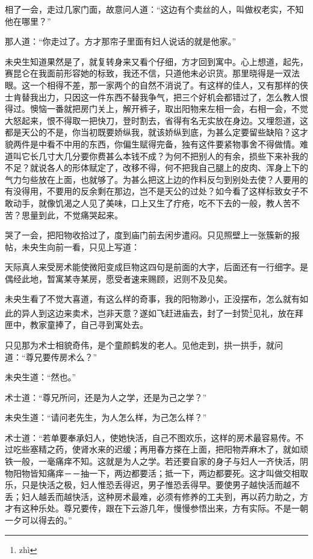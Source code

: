 \documentclass[a4paper,12pt,UTF8,twoside]{ctexbook}
\begin{document}
相了一会，走过几家门面，故意问人道：“这边有个卖丝的人，叫做权老实，不知他在哪里？”

那人道：“你走过了。方才那帘子里面有妇人说话的就是他家。”

未央生知道果然是了，就复转身来又看个仔细，方才回到寓中。心上想道，起先，赛昆仑在我面前形容她的标致，我还不信，只道他未必识货。那里晓得是一双法眼。这一个相得不差，那一家两个的自然不消说了。有这样的佳人，又有那样的侠士肯替我出力，只因这一件东西不替我争气，把三个好机会都错过了，怎么教人恨得过。懊恼一番就把房门关上，解开裤子，取出阳物来左相一会，右相一会，不觉大怒起来，恨不得取一把快刀，登时割去，省得有名无实放在身边。又埋怨道，这都是天公的不是，你当初既要娇纵我，就该娇纵到底，为甚么定要留些缺陷？这才貌两件是中看不中用的东西，你偏生赋得完备，独有这件要紧物事舍不得做情。难道叫它长几寸大几分要你费甚么本钱不成？为何不把别人的有余，损些下来补我的不足？就说各人的形体赋定了，改移不得，何不把我自己腿上的皮肉、浑身上下的气力匀些放在上面，也就够了。为甚么把这上边的作料反匀到别处去使？人要用的有没得用，不要用的反余剩在那边，岂不是天公的过处？如今看了这样标致女子不敢动手，就像饥渴之人见了美味，口上又生了疔疮，吃不下去的一般，教人苦不苦？思量到此，不觉痛哭起来。

哭了一会，把阳物收拾过了，度到庙门前去闲步遣闷。只见照壁上一张簇新的报帖，未央生向前一看，只见上写道：

天际真人来受房术能使微阳变成巨物这四句是前面的大字，后面还有一行细字。是偶经此地，暂寓某寺某房，愿受者速来赐顾，迟则不及见矣。

未央生看了不觉大喜道，有这么样的奇事，我的阳物渺小，正没摆布，怎么就有如此的异人到这边来卖术，岂非天意？遂如飞赶进庙去，封了一封贽\footnote{zh\`i}见礼，放在拜匣中，教家童捧了，自己寻到寓处去。

只见那为术士相貌奇伟，是个童颜鹤发的老人。见他走到，拱一拱手，就问道：“尊兄要传房术么？”

未央生道：“然也。”

术士道：“尊兄所问，还是为人之学，还是为己之学？”

未央生道：“请问老先生，为人怎么样，为己怎么样？”

术士道：“若单要奉承妇人，使她快活，自己不图欢乐，这样的房术最容易传。不过吃些塞精之药，使肾水来的迟缓；再用春方搽在上面，把阳物弄麻木了，就如顽铁一般，一毫痛痒不知。这就是为人之学。若还要自家的身子与妇人一齐快活，阴物阳物皆知痛痒－－抽一下，两边都要活；抵一下，两边都要死。这才叫做交相取乐，只是快活之极，妇人惟恐丢得迟，男子惟恐丢得早。要使男子越快活而越不丢；妇人越丢而越快活，这种房术最难，必须有修养的工夫到，再以药力助之，方才有这种乐处。尊兄要传，跟在下云游几年，慢慢参悟出来，方有实际。不是一朝一夕可以得去的。”
\end{document}
